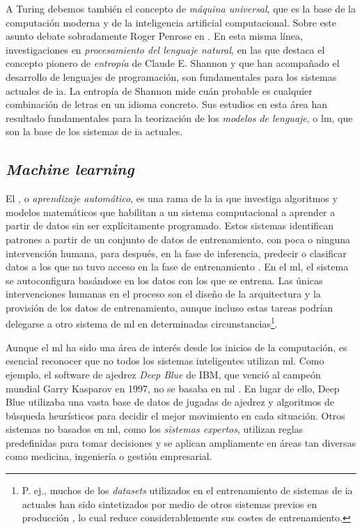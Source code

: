 
A Turing debemos también el concepto de \emph{máquina universal}, que es la base de la computación moderna y de la inteligencia artificial computacional. Sobre este asunto debate sobradamente Roger Penrose en \cite{penroseNuevaMenteEmperador2015}. En esta misma línea, investigaciones en \emph{procesamiento del lenguaje natural}, en las que destaca el concepto pionero de \emph{entropía} de Claude E. Shannon \citep{shannon1951prediction} y que han acompañado el desarrollo de lenguajes de programación, son fundamentales para los sistemas actuales de \gls{ia}. La entropía de Shannon mide cuán probable es cualquier combinación de letras en un idioma concreto. Sus estudios en esta área han resultado fundamentales para la teorización de los \emph{modelos de lenguaje}, o \gls{lm}, que son la base de los sistemas de \gls{ia} actuales.


\subsection{\emph{Machine learning}}

El , o \emph{aprendizaje automático}, es una rama de la \gls{ia} que investiga algoritmos y modelos matemáticos que habilitan a un sistema computacional a aprender a partir de datos sin ser explícitamente programado. Estos sistemas identifican patrones a partir de un conjunto de datos de entrenamiento, con poca o ninguna intervención humana, para después, en la fase de inferencia, predecir o clasificar datos a los que no tuvo acceso en la fase de entrenamiento \citep{gollapudi2016practical}. En el \gls{ml}, el sistema se autoconfigura basándose en los datos con los que se entrena. Las únicas intervenciones humanas en el proceso son el diseño de la arquitectura y la provisión de los datos de entrenamiento, aunque incluso estas tareas podrían delegarse a otro sistema de \gls{ml} en determinadas circunstancias\footnote{P. ej., muchos de los \emph{datasets} utilizados en el entrenamiento de sistemas de \gls{ia} actuales han sido sintetizados por medio de otros sistemas previos en producción \citep{liSyntheticDataGeneration2023}, lo cual reduce considerablemente sus costes de entrenamiento.}.

Aunque el \gls{ml} ha sido una área de interés desde los inicios de la computación, es esencial reconocer que no todos los sistemas inteligentes utilizan \gls{ml}. Como ejemplo, el software de ajedrez \emph{Deep Blue} de IBM, que venció al campeón mundial Garry Kasparov en 1997, no se basaba en \gls{ml} \citep{campbellDeepBlue2002}. En lugar de ello, {Deep Blue} utilizaba una vasta base de datos de jugadas de ajedrez y algoritmos de búsqueda heurísticos para decidir el mejor movimiento en cada situación. Otros sistemas no basados en \gls{ml}, como los \emph{sistemas expertos}, utilizan reglas predefinidas para tomar decisiones y se aplican ampliamente en áreas tan diversas como medicina, ingeniería o gestión empresarial.

